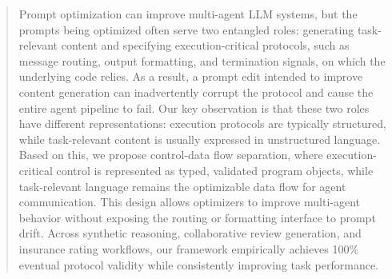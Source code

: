 \begin{abstract}
Prompt optimization can improve multi-agent LLM systems, but the prompts being optimized often serve two entangled roles: generating task-relevant content and specifying execution-critical protocols, such as message routing, output formatting, and termination signals, on which the underlying code relies. As a result, a prompt edit intended to improve content generation can inadvertently corrupt the protocol and cause the entire agent pipeline to fail. Our key observation is that these two roles have different representations: execution protocols are typically structured, while task-relevant content is usually expressed in unstructured language. Based on this, we propose control-data flow separation, where execution-critical control is represented as typed, validated program objects, while task-relevant language remains the optimizable data flow for agent communication. This design allows optimizers to improve multi-agent behavior without exposing the routing or formatting interface to prompt drift. Across synthetic reasoning, collaborative review generation, and insurance rating workflows, our framework empirically achieves 100\% eventual protocol validity while consistently improving task performance.

\end{abstract}
